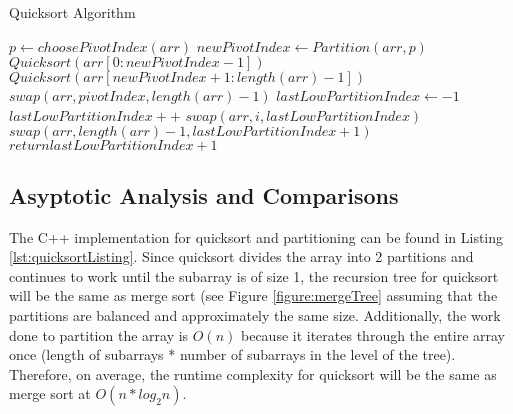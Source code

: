 \documentclass[letterpaper, 10pt,DIV=13]{scrartcl}
\numberwithin{equation}{section} %
\numberwithin{figure}{section} %
\numberwithin{table}{section} %
\begin{document}
\begin{algorithm}
  \caption{Quicksort Algorithm}
  \label{algorithm:quicksort}
  \begin{algorithmic}[1]
         
          \State $p \gets choosePivotIndex(arr)$ 
          \State $newPivotIndex \gets Partition(arr, p)$ 
          \State $Quicksort(arr[0:newPivotIndex - 1])$ 
          \State $Quicksort(arr[newPivotIndex + 1:length(arr) - 1])$ 
        \EndIf
      \EndProcedure
      \\
        \State $swap(arr, pivotIndex, length(arr) - 1)$ 
        \State $lastLowPartitionIndex \gets -1$ 
         
            \State $lastLowPartitionIndex++$ 
            \State $swap(arr, i, lastLowPartitionIndex)$ 
          \EndIf
        \EndFor
        \State $swap(arr, length(arr) - 1, lastLowPartitionIndex + 1)$ 
        \State $return lastLowPartitionIndex + 1$
      \EndProcedure
  \end{algorithmic}
\end{algorithm}

\subsection{Asyptotic Analysis and Comparisons}\label{quicksortAnalysis}
The C++ implementation for quicksort and partitioning can be found in Listing \ref{lst:quicksortListing}. Since quicksort divides the array into 2 partitions and continues to work until the subarray is of size 1, the recursion tree for quicksort will be the same as merge sort (see Figure \ref{figure:mergeTree} assuming that the partitions are balanced and approximately the same size. Additionally, the work done to partition the array is $O(n)$ because it iterates through the entire array once (length of subarrays * number of subarrays in the level of the tree). Therefore, on average, the runtime complexity for quicksort will be the same as merge sort at $O(n * log_2n)$.
\end{document}
